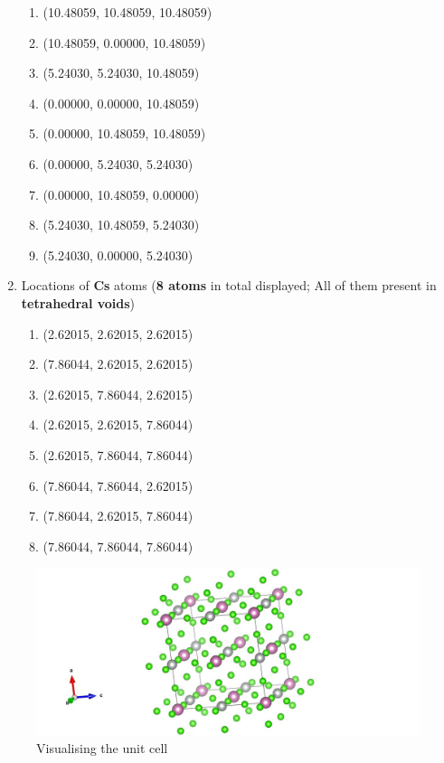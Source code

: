 \documentclass{homework}
\begin{document}
\begin{enumerate}
\begin{enumerate}
        \item (10.48059,  10.48059,  10.48059)
        \item (10.48059,   0.00000,  10.48059)
        \item (5.24030,   5.24030,  10.48059)
        \item (0.00000,   0.00000,  10.48059)
        \item (0.00000,  10.48059,  10.48059)
        \item (0.00000,   5.24030,   5.24030)
        \item (0.00000,  10.48059,   0.00000)
        \item (5.24030,  10.48059,   5.24030)
        \item (5.24030,   0.00000,   5.24030)
    \end{enumerate}
    \item Locations of \textbf{Cs} atoms (\textbf{8 atoms} in total displayed; All of them present in \textbf{tetrahedral voids})
    \begin{enumerate}
        \item (2.62015,   2.62015,   2.62015)
        \item (7.86044,   2.62015,   2.62015)
        \item (2.62015,   7.86044,   2.62015)
        \item (2.62015,   2.62015,   7.86044)
        \item (2.62015,   7.86044,   7.86044)
        \item (7.86044,   7.86044,   2.62015)
        \item (7.86044,   2.62015,   7.86044)
        \item (7.86044,   7.86044,   7.86044)
    \end{enumerate}
\end{enumerate}
\begin{figure}[ht]
\centering
\includegraphics[width=1\textwidth]{part f).jpg}
\caption{Visualising the unit cell}
\label{Unit Cell}
\end{figure}
\end{document}
